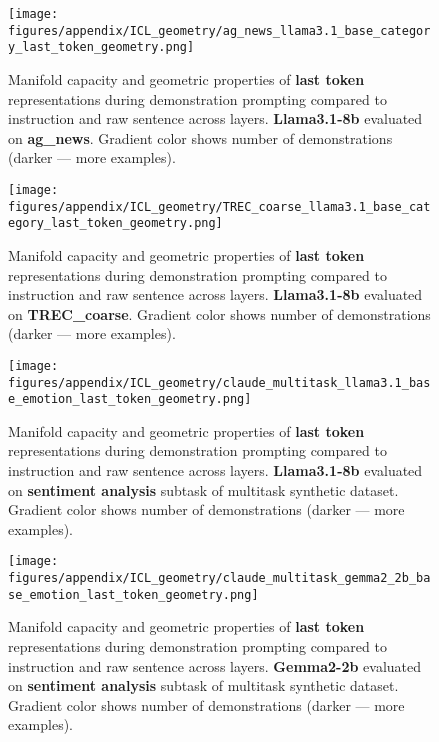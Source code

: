 
\begin{figure*}
    \centering
    \texttt{[image: figures/appendix/ICL\_geometry/ag\_news\_llama3.1\_base\_category\_last\_token\_geometry.png]}
    \caption{Manifold capacity and geometric properties of \textbf{last token} representations during demonstration prompting compared to instruction and raw sentence across layers. \textbf{Llama3.1-8b} evaluated on \textbf{ag\_news}. Gradient color shows number of demonstrations (darker --- more examples).}
\end{figure*}

\begin{figure*}
    \centering
    \texttt{[image: figures/appendix/ICL\_geometry/TREC\_coarse\_llama3.1\_base\_category\_last\_token\_geometry.png]}
    \caption{Manifold capacity and geometric properties of \textbf{last token} representations during demonstration prompting compared to instruction and raw sentence across layers. \textbf{Llama3.1-8b} evaluated on \textbf{TREC\_coarse}. Gradient color shows number of demonstrations (darker --- more examples).}
\end{figure*}

\begin{figure*}
    \centering
    \texttt{[image: figures/appendix/ICL\_geometry/claude\_multitask\_llama3.1\_base\_emotion\_last\_token\_geometry.png]}
    \caption{Manifold capacity and geometric properties of \textbf{last token} representations during demonstration prompting compared to instruction and raw sentence across layers. \textbf{Llama3.1-8b} evaluated on \textbf{sentiment analysis} subtask of multitask synthetic dataset. Gradient color shows number of demonstrations (darker --- more examples).}
    \label{fig:ICL_last_token_extended}
\end{figure*}

\begin{figure*}
    \centering
    \texttt{[image: figures/appendix/ICL\_geometry/claude\_multitask\_gemma2\_2b\_base\_emotion\_last\_token\_geometry.png]}
    \caption{Manifold capacity and geometric properties of \textbf{last token} representations during demonstration prompting compared to instruction and raw sentence across layers. \textbf{Gemma2-2b} evaluated on \textbf{sentiment analysis} subtask of multitask synthetic dataset. Gradient color shows number of demonstrations (darker --- more examples). }
\end{figure*}
